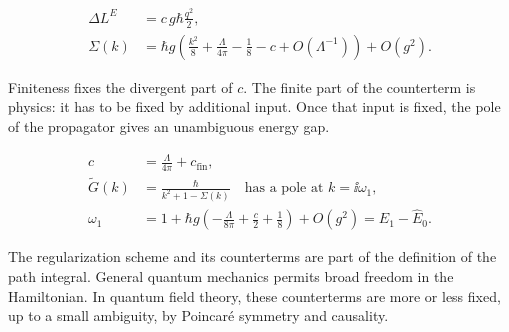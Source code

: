 \begin{align}
  \Delta L^E&=c\,g\hbar\frac{q^2}{2},
  \label{eq:253a-ch02-counterterm}\\
  \Sigma(k)&=\hbar g\left(\frac{k^2}{8}+\frac{\Lambda}{4\pi}
  -\frac18-c+O(\Lambda^{-1})\right)+O(g^2).
  \label{eq:253a-ch02-counterterm-self-energy}
\end{align}

Finiteness fixes the divergent part of $c$. The finite part of the counterterm is physics: it has to be fixed by additional input. Once that input is fixed, the pole of the propagator gives an unambiguous energy gap.

\begin{align}
  c&=\frac{\Lambda}{4\pi}+c_{\mathrm{fin}},
  \label{eq:253a-ch02-counterterm-choice}\\
  \widetilde G(k)&=\frac\hbar{k^2+1-\Sigma(k)}
  \quad\text{has a pole at }k=\ii\omega_1,
  \nonumber\\
  \omega_1&=1+\hbar g\left(-\frac{\Lambda}{8\pi}
  +\frac c2+\frac18\right)+O(g^2)
  =\widehat E_1-\widehat E_0.
  \label{eq:253a-ch02-renormalized-gap}
\end{align}

The regularization scheme and its counterterms are part of the definition of the path integral. General quantum mechanics permits broad freedom in the Hamiltonian. In quantum field theory, these counterterms are more or less fixed, up to a small ambiguity, by Poincar\'e symmetry and causality.

\label{ch:253a-lagrangian-qm-end}
